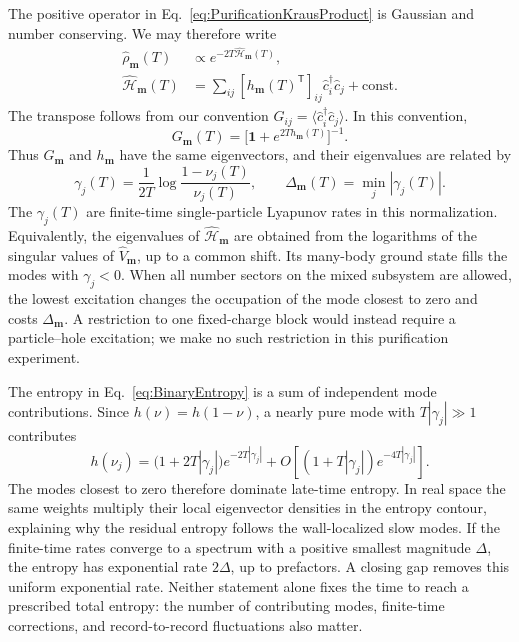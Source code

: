 \documentclass[aps,prb,10pt,twocolumn,superscriptaddress,longbibliography,floatfix]{revtex4-2}
\newcommand{\rec}{\mathbf m}   %
\begin{document}
{The positive operator in Eq.~\eqref{eq:PurificationKrausProduct} is Gaussian and number conserving. We may therefore write
\begin{align}
    \hat\rho_{\rec}(T)&\propto e^{-2T\hat{\mathcal H}_{\rec}(T)},
    \nonumber\\
    \hat{\mathcal H}_{\rec}(T)
    &=\sum_{ij}[h_{\rec}(T)^{\mathsf T}]_{ij}\hat c_i^\dagger\hat c_j
      +\text{const.}
    \label{eq:PurificationEffectiveHamiltonian}
\end{align}
The transpose follows from our convention $G_{ij}=\langle\hat c_i^\dagger\hat c_j\rangle$. In this convention,
\begin{equation}
    G_{\rec}(T)=\big[\mathbf{1}+e^{2T h_{\rec}(T)}\big]^{-1}.
    \label{eq:PurificationFermiFunction}
\end{equation}
Thus $G_{\rec}$ and $h_{\rec}$ have the same eigenvectors, and their eigenvalues are related by
\begin{equation}
    \gamma_j(T)=\frac{1}{2T}\log\frac{1-\nu_j(T)}{\nu_j(T)},
    \qquad \Delta_{\rec}(T)=\min_j|\gamma_j(T)|.
    \label{eq:PurificationFiniteTimeRates}
\end{equation}
The $\gamma_j(T)$ are finite-time single-particle Lyapunov rates in this normalization. Equivalently, the eigenvalues of $\hat{\mathcal H}_{\rec}$ are obtained from the logarithms of the singular values of $\hat V_{\rec}$, up to a common shift. Its many-body ground state fills the modes with $\gamma_j<0$. When all number sectors on the mixed subsystem are allowed, the lowest excitation changes the occupation of the mode closest to zero and costs $\Delta_{\rec}$. A restriction to one fixed-charge block would instead require a particle--hole excitation; we make no such restriction in this purification experiment.

The entropy in Eq.~\eqref{eq:BinaryEntropy} is a sum of independent mode contributions. Since $h(\nu)=h(1-\nu)$, a nearly pure mode with $T|\gamma_j|\gg1$ contributes
\begin{equation}
    h(\nu_j)=
    \big(1+2T|\gamma_j|\big)e^{-2T|\gamma_j|}
    +O\!\left[(1+T|\gamma_j|)e^{-4T|\gamma_j|}\right].
    \label{eq:PurificationEntropyAsymptotic}
\end{equation}
The modes closest to zero therefore dominate late-time entropy. In real space the same weights multiply their local eigenvector densities in the entropy contour, explaining why the residual entropy follows the wall-localized slow modes. If the finite-time rates converge to a spectrum with a positive smallest magnitude $\Delta$, the entropy has exponential rate $2\Delta$, up to prefactors. A closing gap removes this uniform exponential rate. Neither statement alone fixes the time to reach a prescribed total entropy: the number of contributing modes, finite-time corrections, and record-to-record fluctuations also matter.

}
\end{document}

